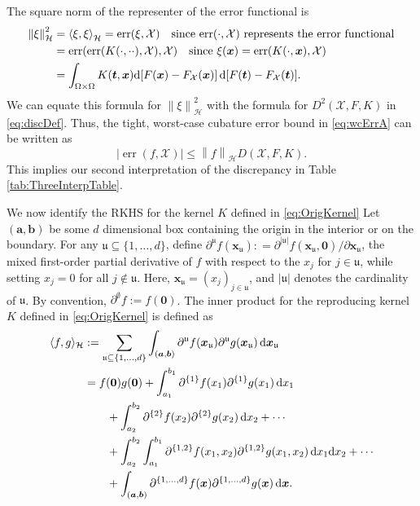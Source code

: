 \documentclass[graybox]{svmult}
\newcommand{\va}{\boldsymbol{a}}
\newcommand{\vb}{\boldsymbol{b}}
\newcommand{\vx}{\boldsymbol{x}}
\newcommand{\vt}{\boldsymbol{t}}
\newcommand{\fraku}{\mathfrak{u}}
\newcommand{\vzero}{\boldsymbol{0}}
\newcommand{\dif}{{\rm d}}
\newcommand{\Xdes}{\mathcal{X}}
\newcommand{\ch}{\mathcal{H}}
\newcommand{\ip}[3][{}]{\ensuremath{\left \langle #2, #3 \right \rangle_{#1}}}
\newcommand{\norm}[2][{}]{\ensuremath{\left \lVert #2 \right \rVert}_{#1}}
\DeclareMathOperator{\err}{err}
\def\abs#1{\ensuremath{\left \lvert #1 \right \rvert}}
\begin{document}
The square norm of the representer of the error functional is 
\begin{align*}
\norm[\ch]{\xi}^2& =\ip[\ch]{\xi}{\xi}=\err(\xi,\Xdes) \quad \text{since $\err(\cdot,\Xdes)$ represents the error functional}\\
& = \err(\err(K(\cdot,\cdot \cdot),\Xdes),\Xdes) \quad \text{since } \xi(\vx)=\err(K(\cdot,\vx),\Xdes)\\
& =\int_{\Omega\times \Omega} K(\vt,\vx)\dif[F(\vx)-F_{\Xdes}(\vx)] \, \dif[F(\vt)-F_{\Xdes}(\vt)].
\end{align*}
We can equate this formula for $\norm[\ch]{\xi}^2$ with the formula for $D^2(\Xdes,F,K)$ in  \eqref{eq:discDef}.  Thus, the tight, worst-case cubature error  bound in \eqref{eq:wcErrA} can be written as
\begin{equation}\label{eq:wcErrB}
\abs{\err(f,\Xdes)} \le \norm[\ch]{f} D(\Xdes,F,K).
\end{equation}
This implies our second interpretation of the discrepancy in Table \ref{tab:ThreeInterpTable}.

We now identify the RKHS for the kernel $K$ defined in \eqref{eq:OrigKernel} Let $(\va,\vb)$ be some $d$ dimensional box containing the origin in the interior or on the boundary. For any $\fraku \subseteq \{1, \ldots, d\}$, define $\partial^\fraku f(\vx_\fraku) : = \partial^{|\fraku|}f(\vx_\fraku,\vzero)/\partial \vx_\fraku$, the mixed first-order partial derivative of $f$ with respect to the $x_j$ for $j\in \fraku$, while setting $x_j=0$ for all $j \notin \fraku$. Here, $\vx_{\fraku} = (x_j)_{j \in \fraku}$, and $|\fraku|$ denotes the cardinality of $\fraku$.  By convention, $\partial^{\emptyset}f := f(\vzero)$.  The inner product for the reproducing kernel $K$ defined in  \eqref{eq:OrigKernel} is defined as 
\begin{align}\label{eq:inner}
\langle f,g \rangle_{\ch} &:= \sum_{\fraku\subseteq \{1,...,d\}}\int_{(\va,\vb)}\partial^{\fraku}f(\vx_\fraku)\partial^{\fraku}g(\vx_\fraku) \, \dif \vx_\fraku \\
\nonumber
& = f(\vzero)g(\vzero)  + \int_{a_1}^{b_1} \partial^{\{1\}}f(x_1)\partial^{\{1\}}g(x_1) \, \dif x_1 \\
\nonumber 
& \qquad + \int_{a_2}^{b_2} \partial^{\{2\}}f(x_2)\partial^{\{2\}}g(x_2) \, \dif x_2 + \cdots \\
\nonumber 
& \qquad + \int_{a_2}^{b_2} \int_{a_1}^{b_1} \partial^{\{1,2\}}f(x_1,x_2)\partial^{\{1,2\}}g(x_1,x_2) \, \dif x_1 \dif x_2+ \cdots \\
\nonumber 
& \qquad + \int_{(\va,\vb)} \partial^{\{1,\ldots, d\}}f(\vx)\partial^{\{1, \ldots, d\}}g(\vx) \, \dif \vx. 
\end{align}
\end{document}
